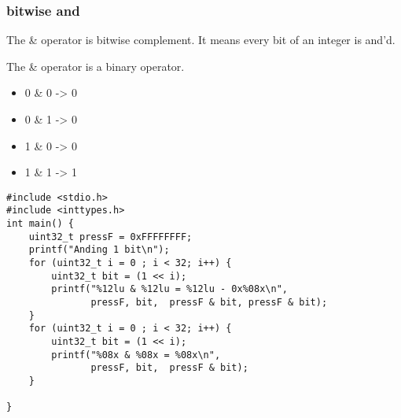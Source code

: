 \documentclass[11pt]{article}
\begin{document}
\subsubsection{bitwise and}
\label{sec:org24cd29f}

The \& operator is bitwise complement. It means every bit of an integer
is and'd. 

The \& operator is a binary operator.

\begin{itemize}
\item 0 \& 0 -> 0
\item 0 \& 1 -> 0
\item 1 \& 0 -> 0
\item 1 \& 1 -> 1
\end{itemize}

\begin{verbatim}
#include <stdio.h>
#include <inttypes.h>
int main() {  
    uint32_t pressF = 0xFFFFFFFF;
    printf("Anding 1 bit\n");
    for (uint32_t i = 0 ; i < 32; i++) {
        uint32_t bit = (1 << i);
        printf("%12lu & %12lu = %12lu - 0x%08x\n",  
               pressF, bit,  pressF & bit, pressF & bit);
    }
    for (uint32_t i = 0 ; i < 32; i++) {
        uint32_t bit = (1 << i);
        printf("%08x & %08x = %08x\n",
               pressF, bit,  pressF & bit);
    }

}
\end{verbatim}
\end{document}

